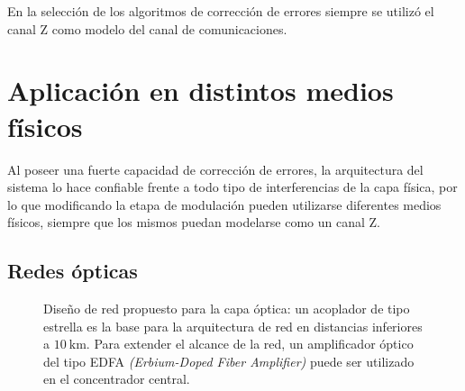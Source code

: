 En la selección de los algoritmos de corrección de errores siempre se utilizó el canal Z como modelo del canal de comunicaciones. %

\section{Aplicación en distintos medios físicos}
Al poseer una fuerte capacidad de corrección de errores, la arquitectura del sistema lo hace confiable frente a todo tipo de interferencias de la capa física, por lo que modificando la etapa de modulación pueden utilizarse diferentes medios físicos, siempre que los mismos puedan modelarse como un canal Z.
\subsection{Redes ópticas}


\begin{figure}[t]
  \centering
    \qquad
    \caption{Diseño de red propuesto para la capa óptica: un acoplador de tipo estrella es la base para la arquitectura de red en distancias inferiores a $10~\mathrm{km}$. Para extender el alcance de la red, un amplificador óptico del tipo EDFA \textit{(Erbium-Doped Fiber Amplifier)} puede ser utilizado en el concentrador central.}
    \label{arch:fig1}
\end{figure}

